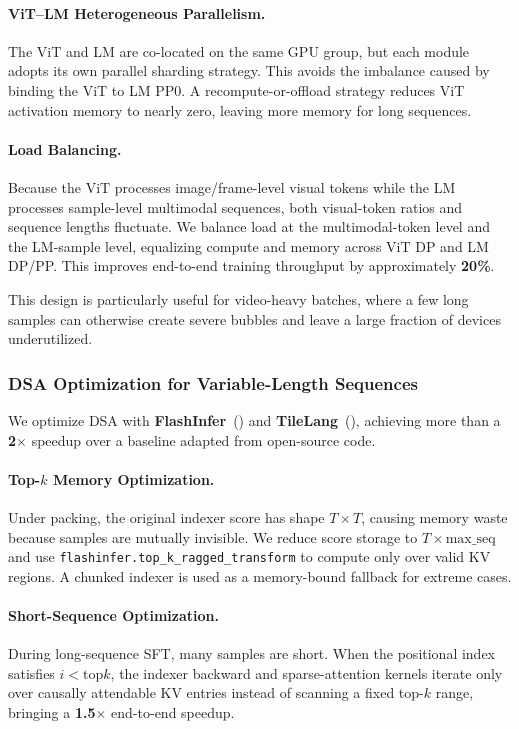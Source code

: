 \documentclass{llmxive}
\begin{document}
\paragraph{ViT--LM Heterogeneous Parallelism.}
The ViT and LM are co-located on the same GPU group, but each module adopts its own parallel sharding strategy. This avoids the imbalance caused by binding the ViT to LM PP0. A recompute-or-offload strategy reduces ViT activation memory to nearly zero, leaving more memory for long sequences.

\paragraph{Load Balancing.}
Because the ViT processes image/frame-level visual tokens while the LM processes sample-level multimodal sequences, both visual-token ratios and sequence lengths fluctuate. We balance load at the multimodal-token level and the LM-sample level, equalizing compute and memory across ViT DP and LM DP/PP. This improves end-to-end training throughput by approximately \textbf{20\%}.

This design is particularly useful for video-heavy batches, where a few long samples can otherwise create severe bubbles and leave a large fraction of devices underutilized.

\subsubsection{DSA Optimization for Variable-Length Sequences}

We optimize DSA with \textbf{FlashInfer}~(\cite{flashinfer}) and \textbf{TileLang}~(\cite{tilelang}), achieving more than a \textbf{2$\times$} speedup over a baseline adapted from open-source code.

\paragraph{Top-\texorpdfstring{$k$}{k} Memory Optimization.}
Under packing, the original indexer score has shape $T \times T$, causing memory waste because samples are mutually invisible. We reduce score storage to $T \times \text{max\_seq}$ and use \texttt{flashinfer.top\_k\_ragged\_transform} to compute only over valid KV regions. A chunked indexer is used as a memory-bound fallback for extreme cases.

\paragraph{Short-Sequence Optimization.}
During long-sequence SFT, many samples are short. When the positional index satisfies $i < \text{top}k$, the indexer backward and sparse-attention kernels iterate only over causally attendable KV entries instead of scanning a fixed top-$k$ range, bringing a \textbf{1.5$\times$} end-to-end speedup.
\end{document}
